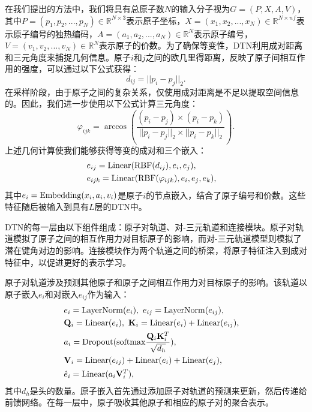 
在我们提出的方法中，我们将具有总原子数$N$的输入分子视为$G = (P, X, A, V)$，其中$P = (p_1, p_2, ..., p_N) \in \mathbb{R}^{N \times 3}$表示原子坐标，$X = (x_1, x_2, ..., x_N) \in \mathbb{R}^{N \times nf}$表示原子编号的独热编码，$A = (a_1, a_2, ..., a_N) \in \mathbb{R}^{N}$表示原子编号，$V = (v_1, v_2, ..., v_N) \in \mathbb{R}^{N}$表示原子的价数。为了确保等变性，DTN利用成对距离和三元角度来捕捉几何信息。原子$i$和$j$之间的欧几里得距离，反映了原子间相互作用的强度，可以通过以下公式获得：
\begin{equation}
    d_{ij} = ||p_i - p_j||_2.
\end{equation}
在采样阶段，由于原子之间的复杂关系，仅使用成对距离是不足以提取空间信息的。因此，我们进一步使用以下公式计算三元角度：
\begin{equation}
    \varphi_{ijk} = \arccos (\frac{(p_i - p_j) \times (p_i - p_k)}{||p_i - p_j||_2 \times ||p_i - p_k||_2}). 
\end{equation}
上述几何计算使我们能够获得等变的成对和三个嵌入：
\begin{eqnarray}
    &e_{ij} = {\rm Linear}({\rm RBF}(d_{ij}), e_i, e_j),& \\
    &e_{ijk} = {\rm Linear}({\rm RBF}(\varphi_{ijk}), e_i, e_j, e_k),&
\end{eqnarray}
其中$e_i = {\rm Embedding}(x_i, a_i, v_i)$是原子$i$的节点嵌入，结合了原子编号和价数。这些特征随后被输入到具有$L$层的DTN中。

DTN的每一层由以下组件组成：原子对轨道、对-三元轨道和连接模块。原子对轨道模拟了原子之间的相互作用力对目标原子的影响，而对-三元轨道模型则模拟了潜在键角对边的影响。连接模块作为两个轨道之间的桥梁，将原子特征注入到成对特征中，以促进更好的表示学习。

原子对轨道涉及预测其他原子和原子之间相互作用力对目标原子的影响。该轨道以原子嵌入$e_i$和对嵌入$e_{ij}$作为输入：
\begin{eqnarray}
    &e_i = {\rm LayerNorm}(e_i), \ e_{ij} = {\rm LayerNorm}(e_{ij}),& \\
    &\mathbf{Q}_i = {\rm Linear}(e_i), \ \mathbf{K}_i = {\rm Linear}(e_i) + {\rm Linear}(e_{ij}),& \\
    &a_i = {\rm Dropout}({\rm softmax} \frac{\mathbf{Q}_i \mathbf{K}_i^T}{\sqrt{d_h}}), & \\
    &\mathbf{V}_i = {\rm Linear}(e_{ij}) + {\rm Linear}(e_{i}) + {\rm Linear}(e_{j}),& \\
    &\hat{e}_i = {\rm Linear}(a_i \mathbf{V}_i^T),&
\end{eqnarray}
其中$d_h$是头的数量。原子嵌入首先通过添加原子对轨道的预测来更新，然后传递给前馈网络。在每一层中，原子吸收其他原子和相应的原子对的聚合表示。

